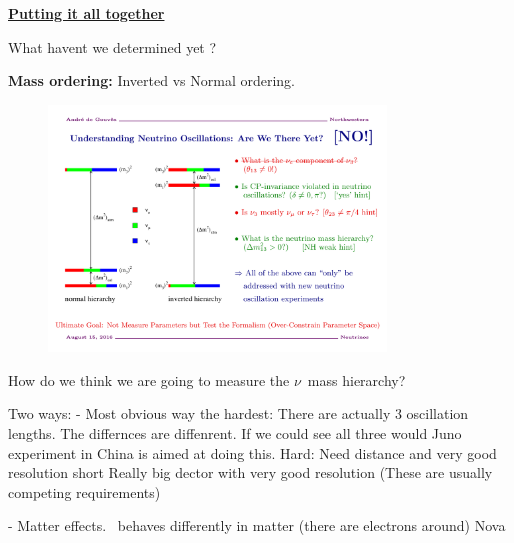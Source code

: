 {\underline{\textbf{Putting it all together}}


What havent we determined yet ?

\textbf{Mass ordering:}  Inverted vs Normal ordering. 

\begin{figure}[h!]
\centering
\includegraphics[width=0.8\textwidth]{./NuMass.pdf}
\end{figure}

How do we think we are going to measure the $\nu$\ mass hierarchy?

Two ways: 
  - Most obvious way the hardest:  
  There are actually 3 oscillation lengths.       
  The differnces are diffenrent. If we could see all three would 
  Juno experiment in China is aimed at doing this. 
   Hard: Need distance and very good resolution short 
          Really big dector with very good resolution (These are usually competing requirements) 

  - Matter effects. 
      \nue\ behaves differently in matter (there are electrons around) 
      Nova 

}
